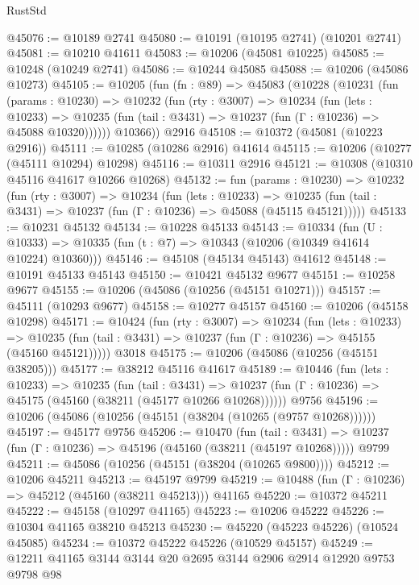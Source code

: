 \begin{lexlean}{RustStd}
\begin{coremodule}
@45076 := @10189 @2741
@45080 := @10191 (@10195 @2741) (@10201 @2741)
@45081 := @10210 @41611
@45083 := @10206 (@45081 @10225)
@45085 := @10248 (@10249 @2741)
@45086 := @10244 @45085
@45088 := @10206 (@45086 @10273)
@45105 := @10205
    (fun (fn : @89) =>
    @45083
      (@10228
        (@10231
          (fun (params : @10230) =>
          @10232
            (fun (rty : @3007) =>
            @10234
              (fun (lets : @10233) =>
              @10235 (fun (tail : @3431) => @10237 (fun (Γ : @10236) => @45088 @10320))))))
        @10366))
    @2916
@45108 := @10372 (@45081 (@10223 @2916))
@45111 := @10285 (@10286 @2916) @41614
@45115 := @10206 (@10277 (@45111 @10294) @10298)
@45116 := @10311 @2916
@45121 := @10308 (@10310 @45116 @41617 @10266 @10268)
@45132 := fun (params : @10230) =>
  @10232
    (fun (rty : @3007) =>
    @10234
      (fun (lets : @10233) =>
      @10235 (fun (tail : @3431) => @10237 (fun (Γ : @10236) => @45088 (@45115 @45121)))))
@45133 := @10231 @45132
@45134 := @10228 @45133
@45143 := @10334
    (fun (U : @10333) => @10335 (fun (t : @7) => @10343 (@10206 (@10349 @41614 @10224) @10360)))
@45146 := @45108 (@45134 @45143) @41612
@45148 := @10191 @45133 @45143
@45150 := @10421 @45132 @9677
@45151 := @10258 @9677
@45155 := @10206 (@45086 (@10256 (@45151 @10271)))
@45157 := @45111 (@10293 @9677)
@45158 := @10277 @45157
@45160 := @10206 (@45158 @10298)
@45171 := @10424
    (fun (rty : @3007) =>
    @10234
      (fun (lets : @10233) =>
      @10235 (fun (tail : @3431) => @10237 (fun (Γ : @10236) => @45155 (@45160 @45121)))))
    @3018
@45175 := @10206 (@45086 (@10256 (@45151 @38205)))
@45177 := @38212 @45116 @41617
@45189 := @10446
    (fun (lets : @10233) =>
    @10235
      (fun (tail : @3431) =>
      @10237 (fun (Γ : @10236) => @45175 (@45160 (@38211 (@45177 @10266 @10268))))))
    @9756
@45196 := @10206 (@45086 (@10256 (@45151 (@38204 (@10265 (@9757 @10268))))))
@45197 := @45177 @9756
@45206 := @10470
    (fun (tail : @3431) => @10237 (fun (Γ : @10236) => @45196 (@45160 (@38211 (@45197 @10268)))))
    @9799
@45211 := @45086 (@10256 (@45151 (@38204 (@10265 @9800))))
@45212 := @10206 @45211
@45213 := @45197 @9799
@45219 := @10488 (fun (Γ : @10236) => @45212 (@45160 (@38211 @45213))) @41165
@45220 := @10372 @45211
@45222 := @45158 (@10297 @41165)
@45223 := @10206 @45222
@45226 := @10304 @41165 @38210 @45213
@45230 := @45220 (@45223 @45226) (@10524 @45085)
@45234 := @10372 @45222 @45226 (@10529 @45157)
@45249 := @12211
    @41165
    @3144
    @3144
    @20
    @2695
    @3144
    @2906
    @2914
    @12920
    @9753
    @9798
    @98

\end{coremodule}
\end{lexlean}
